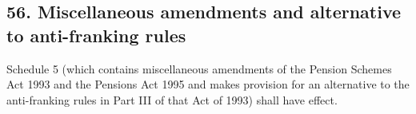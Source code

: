 \documentclass[12pt,a4paper]{article}
\begin{document}
%
%
%
%
%
%


\subsection{56. Miscellaneous amendments and alternative to anti-franking rules}

Schedule 5 (which contains miscellaneous amendments of the Pension Schemes Act 1993 and the Pensions Act 1995 and makes provision for an alternative to the anti-franking rules in Part III of that Act of 1993) shall have effect.
\end{document}
